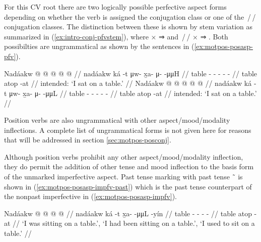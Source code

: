 \documentclass[12pt,letterpaper,oneside,article]{memoir}
\begin{document}
For this CV root there are two logically possible perfective aspect forms depending on whether the verb is assigned the  conjugation class or one of the \,/\,/ conjugation classes.
The distinction between these is shown by stem variation as summarized in (\ref{ex:intro-conj-pfvstem}), where  ×  ⇒  and \,/\,/ ×  ⇒ .
Both possibilties are ungrammatical as shown by the sentences in (\ref{ex:motpos-posasp-pfv}).

\pex\label{ex:motpos-posasp-pfv}%
\a\label{ex:motpos-posasp-pfv-nonz}%
\ljudge{*}%
%
\begingl
	\gla	Nadáakw  @ {}  @ {} @ {} @ {} @ {} //
	\glb	nadáakw ká -t
		μw- x̱a- μ-  -μμH //
	\glc	table  -
		- - -  - //
	\gld	table atop -at
		 {} {} {} {} //
	\glft	intended: ‘I sat on a table.’
		//
\endgl
\a\label{ex:motpos-posasp-pfv-nonz}%
\ljudge{*}%
%
\begingl
	\gla	Nadáakw  @ {}  @ {} @ {} @ {} @ {} //
	\glb	nadáakw ká -t
		μw- x̱a- μ-  -μμL //
	\glc	table  -
		- - -  - //
	\gld	table atop -at
		 {} {} {} {} //
	\glft	intended: ‘I sat on a table.’
		//
\endgl
\xe

Position verbs are also ungrammatical with other aspect/mood/modality inflections.
A complete list of ungrammatical forms is not given here for reasons that will be addressed in section \ref{sec:motpos-posconj}.

Although position verbs prohibit any other aspect/mood/modality inflection, they do permit the addition of other tense and mood inflection to the basis form of the unmarked imperfective aspect.
Past tense marking with past tense  \~\  is shown in (\ref{ex:motpos-posasp-impfv-past}) which is the past tense counterpart of the nonpast imperfective in (\ref{ex:motpos-posasp-impfv}).

\ex\label{ex:motpos-posasp-impfv-past}%
%
\begingl
	\gla	Nadáakw  @ {}  @ {} @ {} @ {} //
	\glb	nadáakw ká -t x̱a-  -μμL -yín //
	\glc	table  - -  - - //
	\gld	table atop -at  {} {} {} //
	\glft	‘I was sitting on a table.’, ‘I had been sitting on a table.’, ‘I used to sit on a table.’
		//
\endgl
\xe
\end{document}
